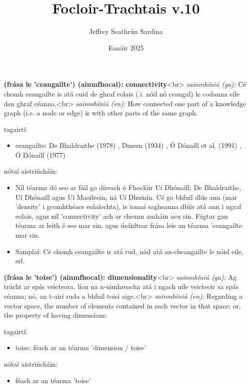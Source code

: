 \documentclass{article}
\title{Focloir-Trachtais v.10}
\author{Jeffrey Seathrún Sardina}
\date{Eanáir 2025}
\begin{document}
\maketitle


\textbf{(frása le 'ceangailte') (ainmfhocal): connectivity}<br>
\textit{sainmhíniú (ga):} Cé chomh ceangailte is atá cuid de ghraf eolais (.i. nód nó ceangal) le codanna eile den ghraf céanna.<br>
\textit{sainmhíniú (en):} How connected one part of a knowledge graph (i.e. a node or edge) is with other parts of the same graph.

tagairtí:
\begin{itemize}
	\item ceangailte: De Bhaldraithe (1978) \cite{de-bhaldraithe}, Dineen (1934) \cite{dineen}, Ó Dónaill et al. (1991) \cite{focloir-beag}, Ó Dónaill (1977) \cite{odonaill}
\end{itemize}

nótaí aistriúcháin:
\begin{itemize}
	\item Níl téarma dó seo ar fáil go díreach ó Fhoclóir Uí Dhónaill, De Bhaldraithe, Uí Dhónaill agus Uí Maoileoin, ná Uí Dhuinín. Cé go bhfuil dlús ann (mar 'density' i gcomhthéacs eolaíochta), is iomaí saghsanna dlúis atá ann i ngraf eolais, agus níl 'connectivity' ach ar cheann amháin acu sin. Fágtar gan téarma ar leith é seo mar sin, agus úsáidtear frása leis an téarma 'ceangailte mar sin.
	\item Samplaí: Cé chomh ceangailte is atá rud, nód atá an-cheangailte le nóid eile, srl.
\end{itemize}


\textbf{(frása le 'toise') (ainmfhocal): dimensionality}<br>
\textit{sainmhíniú (ga):} Ag trácht ar spás veicteora, líon na n-uimhreacha atá i ngach uile veicteoir sa spás céanna; nó, an t-airí ruda a bhfuil toisí aige.<br>
\textit{sainmhíniú (en):} Regarding a vector space, the number of elements contained in each vector in that space; or, the property of having dimensions.

tagairtí:
\begin{itemize}
	\item toise: féach ar an téarma 'dimension / toise'
\end{itemize}

nótaí aistriúcháin:
\begin{itemize}
	\item féach ar an téarma 'toise'
\end{itemize}
\end{document}
